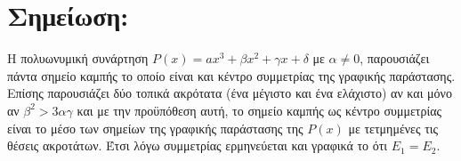 \section*{Σημείωση:}
Η πολυωνυμική συνάρτηση $P(x)=ax^3+\beta x^2+\gamma x+\delta$ με $\alpha \neq 0$, παρουσιάζει πάντα σημείο καμπής το οποίο είναι και κέντρο συμμετρίας της γραφικής παράστασης.
Επίσης παρουσιάζει δύο τοπικά ακρότατα (ένα μέγιστο και ένα ελάχιστο) αν και μόνο αν $\beta^2>3\alpha\gamma$ και με την προϋπόθεση αυτή, το σημείο καμπής ως κέντρο συμμετρίας είναι το μέσο των σημείων της γραφικής παράστασης της $P(x)$ με τετμημένες τις θέσεις ακροτάτων. Έτσι λόγω συμμετρίας ερμηνεύεται και γραφικά το ότι $E_1=E_2$.
